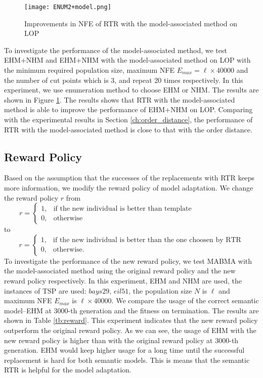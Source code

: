 \begin{figure}[htbp] 
        \centering
        \texttt{[image: ENUM2+model.png]}
        \caption{ Improvements in NFE of RTR with the model-associated method on LOP } 
        \label{fig:enum2_model}
\end{figure}

To investigate the performance of the model-associated method, we test EHM+NHM and EHM+NHM with the model-associated method on LOP with the minimum required population size, maximum NFE $E_{max} = \ell\times 40000$ and the number of cut points which is 3, and repeat 20 times respectively. In this experiment, we use enumeration method to choose EHM or NHM. The results are shown in Figure \ref{fig:enum2_model}. The results shows that RTR with the model-associated method is able to improve the performance of EHM+NHM on LOP. Comparing with the experimental results in Section \ref{ch:order_distance}, the performance of RTR with the model-associated method is close to that with the order distance. 

\subsection*{Reward Policy}

Based on the assumption that the successes of the replacements with RTR keeps more information, we modify the reward policy of model adaptation. We change the reward policy $r$ from \[r=
\begin{cases}
1,  & \mbox{if the new individual is better than template~~~~~~~~~~~~~~~~~~~~ }\\
0, & \mbox{otherwise}
\end{cases}
\]to\[r=
\begin{cases}
1,  & \mbox{if the new individual is better than the one choosen by RTR}\\
0, & \mbox{otherwise.}
\end{cases}
\]
To investigate the performance of the new reward policy, we test MABMA with the model-associated method using the original reward policy and the new reward policy respectively. In this experiment, EHM and NHM are used, the instances of TSP are used: $bays29$, $eil51$, the population size $N$ is $\ell$ and maximum NFE $E_{max}$ is $\ell\times 40000$. We compare the usage of the correct semantic model--EHM at $3000$-th generation and the fitness on termination.  The results are shown in Table \ref{tb:reward}.  This experiment indicates that the new reward policy outperform the original reward policy.  As we can see, the usage of EHM with the new reward policy is higher than with the original reward policy at $3000$-th generation. EHM would keep higher usage for a long time until the successful replacement is hard for both semantic models. This is means that the semantic RTR is helpful for the model adaptation.

